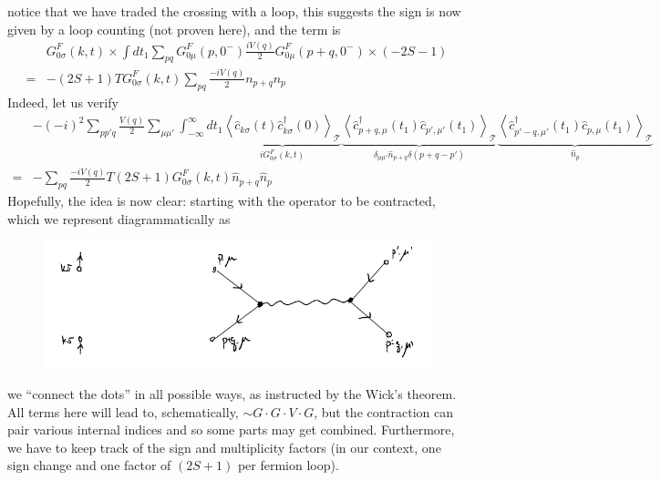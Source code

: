 notice  that we have traded the crossing with a loop, this suggests the sign is now given by a loop counting (not proven here), and the term is
\begin{align*}
    &G_{0\sigma}^{F}\left( k,t \right) \times \int{dt_1\sum_{pq}{G_{0\mu}^{F}\left( p,0^- \right) \frac{iV\left( q \right)}{2}G_{0\mu}^{F}\left( p+q,0^- \right) \times \left( -2S-1 \right)}}\\
    =&-\left( 2S+1 \right) TG_{0\sigma}^{F}\left( k,t \right) \sum_{pq}{\frac{-iV\left( q \right)}{2}n_{p+q}n_p}
\end{align*}
Indeed, let us verify
\begin{align*}
    &-\left( -i \right) ^2\sum_{pp'q}{\frac{V\left( q \right)}{2}\sum_{\mu \mu '}{\int_{-\infty}^{\infty}{dt_1\underset{iG_{0\sigma}^{F}\left( k,t \right)}{\underbrace{\left< \hat{c}_{k\sigma}\left( t \right) \hat{c}_{k\sigma}^{\dagger}\left( 0 \right) \right> _{\mathcal{T}}}}\underset{\delta _{\mu \mu '}\hat{n}_{p+q}\delta \left( p+q-p' \right)}{\underbrace{\left< \hat{c}_{p+q,\mu}^{\dagger}\left( t_1 \right) \hat{c}_{p',\mu '}\left( t_1 \right) \right> _{\mathcal{T}}}}\underset{\hat{n}_p}{\underbrace{\left< \hat{c}_{p'-q,\mu '}^{\dagger}\left( t_1 \right) \hat{c}_{p,\mu}\left( t_1 \right) \right> _{\mathcal{T}}}}}}}\\
    =&-\sum_{pq}{\frac{-iV\left( q \right)}{2}T\left( 2S+1 \right) G_{0\sigma}^{F}\left( k,t \right) \hat{n}_{p+q}\hat{n}_p}
\end{align*}
Hopefully, the idea is now clear: starting with the operator to be contracted, which we represent diagrammatically as

\begin{figure}[H]
    \centering
    \includegraphics[width=\textwidth]{jupyterbook/data/fig/lec17-fig02.png}
\end{figure}

we ``connect the dots'' in all possible ways, as instructed by the Wick's theorem. All terms here will lead to, schematically, $\sim G\cdot G\cdot V\cdot G$, but the contraction can pair various internal indices and so some parts may get combined. Furthermore, we have to keep track of the sign and multiplicity factors (in our context, one sign change and one factor of $(2S+1)$ per fermion loop).

